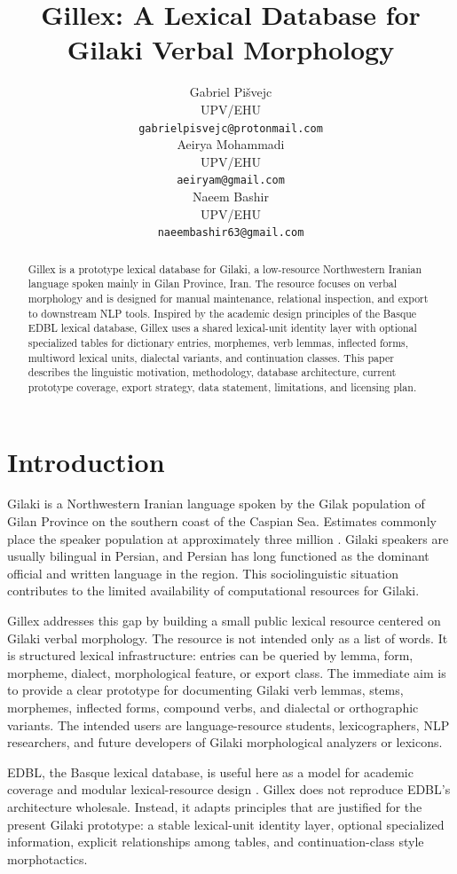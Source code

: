 \documentclass[11pt]{article}
\title{Gillex: A Lexical Database for Gilaki Verbal Morphology}
\author{Gabriel Pišvejc \\
  UPV/EHU \\
  \texttt{gabrielpisvejc@protonmail.com} \\\And
  Aeirya Mohammadi \\
  UPV/EHU \\
  \texttt{aeiryam@gmail.com} \\\And
  Naeem Bashir \\
  UPV/EHU \\
  \texttt{naeembashir63@gmail.com} \\}
\begin{document}
\maketitle

\begin{abstract}
Gillex is a prototype lexical database for Gilaki, a low-resource Northwestern Iranian language spoken mainly in Gilan Province, Iran. The resource focuses on verbal morphology and is designed for manual maintenance, relational inspection, and export to downstream NLP tools. Inspired by the academic design principles of the Basque EDBL lexical database, Gillex uses a shared lexical-unit identity layer with optional specialized tables for dictionary entries, morphemes, verb lemmas, inflected forms, multiword lexical units, dialectal variants, and continuation classes. This paper describes the linguistic motivation, methodology, database architecture, current prototype coverage, export strategy, data statement, limitations, and licensing plan.
\end{abstract}

\section{Introduction}

Gilaki is a Northwestern Iranian language spoken by the Gilak population of Gilan Province on the southern coast of the Caspian Sea. Estimates commonly place the speaker population at approximately three million \cite{ivanov2015gilaki}. Gilaki speakers are usually bilingual in Persian, and Persian has long functioned as the dominant official and written language in the region. This sociolinguistic situation contributes to the limited availability of computational resources for Gilaki.

Gillex addresses this gap by building a small public lexical resource centered on Gilaki verbal morphology. The resource is not intended only as a list of words. It is structured lexical infrastructure: entries can be queried by lemma, form, morpheme, dialect, morphological feature, or export class. The immediate aim is to provide a clear prototype for documenting Gilaki verb lemmas, stems, morphemes, inflected forms, compound verbs, and dialectal or orthographic variants. The intended users are language-resource students, lexicographers, NLP researchers, and future developers of Gilaki morphological analyzers or lexicons.

EDBL, the Basque lexical database, is useful here as a model for academic coverage and modular lexical-resource design \cite{aduriz1998edbl, aldezabal2001edbl}. Gillex does not reproduce EDBL's architecture wholesale. Instead, it adapts principles that are justified for the present Gilaki prototype: a stable lexical-unit identity layer, optional specialized information, explicit relationships among tables, and continuation-class style morphotactics.
\end{document}
